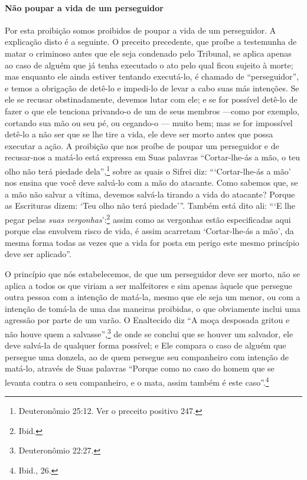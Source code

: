 \paragraph{Não poupar a vida de um perseguidor}

Por esta proibição somos proibidos de poupar a vida de um perseguidor. A
explicação disto é a seguinte. O preceito precedente, que proíbe a
testemunha de matar o criminoso antes que ele seja condenado pelo Tribunal,
se aplica apenas ao caso de alguém que já tenha executado o ato pelo
qual ficou sujeito à morte; mas enquanto ele ainda estiver tentando
executá-lo, é chamado de ``perseguidor'', e temos a obrigação de detê-lo
e impedi-lo de levar a cabo suas más intenções. Se ele se recusar
obstinadamente, devemos lutar com ele; e se for possível detê-lo de
fazer o que ele tenciona privando-o de um de seus membros ---como por
exemplo, cortando sua mão ou seu pé, ou cegando-o --- muito bem; mas se
for impossível detê-lo a não ser que se lhe tire a vida, ele deve ser
morto antes que possa executar a ação. A proibição que nos proíbe de
poupar um perseguidor e de recusar-nos a matá-lo está expressa em Suas
palavras ``Cortar-lhe-ás a mão, o teu olho não terá piedade dela'',\footnote{Deuteronômio 25:12. Ver o preceito positivo 247.} sobre as quais o Sifrei diz:
```Cortar-lhe-ás a mão' nos ensina que você deve salvá-lo com a mão do
atacante. Como sabemos que, se a mão não salvar a vítima, devemos
salvá-la tirando a vida do atacante? Porque as Escrituras dizem: `Teu
olho não terá piedade'''. Também está dito ali: ```E lhe pegar pelas
\emph{suas vergonhas}':\footnote{Ibid.} assim como as vergonhas estão
especificadas aqui porque elas envolvem risco de vida, é assim acarretam
`Cortar-lhe-ás a mão', da mesma forma todas as vezes que a vida for
posta em perigo este mesmo princípio deve ser aplicado''.

O princípio que nós estabelecemos, de que um perseguidor deve ser morto,
não se aplica a todos os que viriam a ser malfeitores e sim apenas
àquele que persegue outra pessoa com a intenção de matá-la, mesmo que
ele seja um menor, ou com a intenção de tomá-la de uma das maneiras
proibidas, o que obviamente inclui uma agressão por parte de um varão. O
Enaltecido diz ``A moça desposada gritou e não houve quem a salvasse'',\footnote{Deuteronômio 22:27.} de onde se conclui que se houver um salvador, ele
deve salvá-la de qualquer forma possível; e Ele compara o caso de alguém
que persegue uma donzela, ao de quem persegue seu companheiro com
intenção de matá-lo, através de Suas palavras ``Porque como no caso do
homem que se levanta contra o seu companheiro, e o mata, assim também é
este caso''.\footnote{Ibid., 26.}

